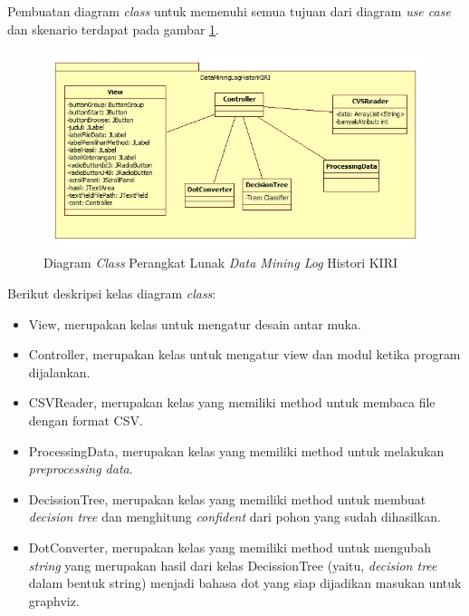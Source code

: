 Pembuatan diagram \textsl{class} untuk memenuhi semua tujuan dari diagram \textsl{use case} dan skenario terdapat pada gambar \ref{fig:classDiagram}.

\begin{figure}[H]
\includegraphics[scale=0.7]{Gambar/classdiagram.jpg}
\caption[Diagram \textsl{Class} Perangkat Lunak \textsl{Data Mining Log} Histori KIRI]{Diagram \textsl{Class} Perangkat Lunak \textsl{Data Mining Log} Histori KIRI} 
\label{fig:classDiagram}
\end{figure}

Berikut deskripsi kelas diagram \textsl{class}:
\begin{itemize}
	\item View, merupakan kelas untuk mengatur desain antar muka.
	\item Controller, merupakan kelas untuk mengatur view dan modul ketika program dijalankan.
	\item CSVReader, merupakan kelas yang memiliki method untuk membaca file dengan format CSV.
	\item ProcessingData, merupakan kelas yang memiliki method untuk melakukan \textsl{preprocessing data}.
	\item DecissionTree, merupakan kelas yang memiliki method untuk membuat \textsl{decision tree} dan menghitung \textsl{confident} dari pohon yang sudah dihasilkan.
	\item DotConverter, merupakan kelas yang memiliki method untuk mengubah \textsl{string} yang merupakan hasil dari kelas DecissionTree (yaitu, \textsl{decision tree} dalam bentuk string) menjadi bahasa dot yang siap dijadikan masukan untuk graphviz.
\end{itemize}
	
















